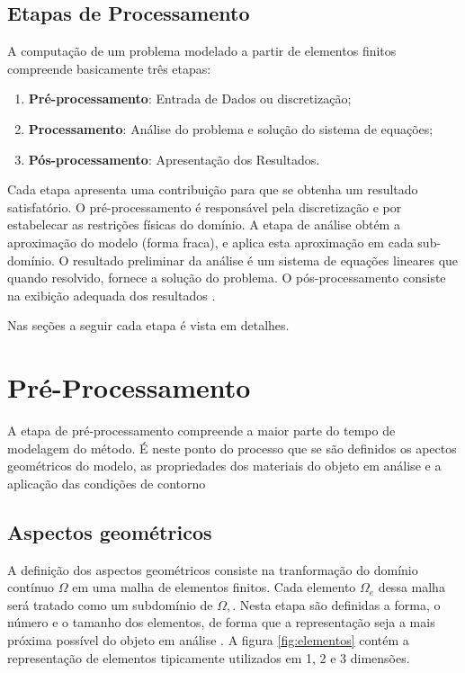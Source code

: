 \documentclass[
    12pt,               %
    openright,          %
    oneside,
    a4paper,            %
    english,            %
    french,             %
    spanish,            %
    brazil              %
    ]{abntex2}
\begin{document}
\subsection{Etapas de Processamento}
A computação de um problema modelado a partir de elementos finitos compreende basicamente três etapas: 
\begin{enumerate}  
\item \textbf{Pré-processamento}: Entrada de Dados ou discretização;
\item \textbf{Processamento}: Análise do problema e  solução do sistema de equações;
\item \textbf{Pós-processamento}: Apresentação dos Resultados. 
\end{enumerate}

Cada etapa apresenta uma contribuição para que se obtenha um resultado satisfatório. O pré-processamento é responsável pela discretização e por estabelecar as restrições físicas do domínio. A etapa de análise obtém a aproximação do modelo (forma fraca), e aplica esta aproximação em cada sub-domínio. O resultado preliminar da análise é um sistema de equações lineares que quando resolvido, fornece a solução do problema.  O pós-processamento consiste na exibição adequada dos resultados \cite[p. 665, 666]{zien}.


Nas seções a seguir cada etapa é vista em detalhes.

\section{Pré-Processamento}
\label{sec:preProc}

A etapa de pré-processamento compreende a maior parte do tempo de modelagem do método. É neste ponto do processo que se são definidos os apectos geométricos do modelo, as propriedades dos materiais do objeto em análise e a aplicação das condições de contorno \cite[p. 9, 665]{zien}

\subsection{Aspectos geométricos} 
A definição dos aspectos geométricos consiste na tranformação do domínio contínuo $\Omega$ em uma malha de elementos finitos. Cada elemento $\Omega_e$ dessa malha será tratado como um subdomínio de $\Omega,$.  
Nesta etapa são definidas a forma, o número e o tamanho dos elementos, de forma que a representação seja a mais próxima possível do objeto em análise \cite[p. 154]{desai}.
A figura \ref{fig:elementos} contém a representação de elementos tipicamente utilizados em 1, 2 e 3 dimensões. 
\end{document}
